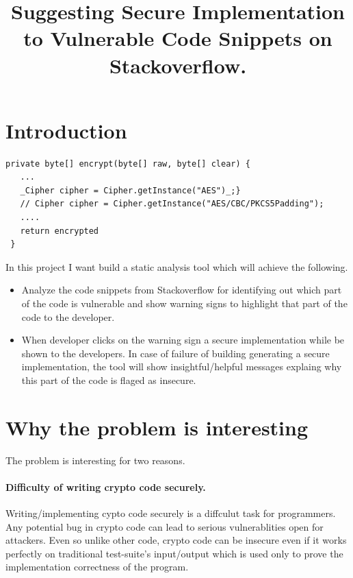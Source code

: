 \documentclass[sigconf]{acmart}
\begin{document}
\title{Suggesting Secure Implementation to Vulnerable Code Snippets on Stackoverflow.}


\maketitle
\section{Introduction}
\begin{lstlisting}[caption={A real code snippet taken from Stackoverflow. I want to build a tool which after analyzing the code snippet will highlight the part of the code that is insecure and suggest an alternative secure implementation as showed in the figure.}, label={fig:motivating-example}]
 private byte[] encrypt(byte[] raw, byte[] clear) {
   ...
   _Cipher cipher = Cipher.getInstance("AES")_;}
   // Cipher cipher = Cipher.getInstance("AES/CBC/PKCS5Padding");
   ....
   return encrypted
 }
  \end{lstlisting}
\label{into}
In this project I want build a static analysis tool which will achieve the following. 
\begin{itemize}
\item  Analyze the code snippets from Stackoverflow for identifying out which part of the code is vulnerable and show warning signs to highlight that part of the code to the developer.
\item When developer clicks on the warning sign a secure implementation while be shown to the developers. In case of failure of building generating a secure implementation, the tool will show insightful/helpful messages explaing why this part of the code is flaged as insecure.  
\end{itemize}

\section{Why the problem is interesting}
The problem is interesting for two reasons. 

\paragraph{Difficulty of writing crypto code securely.} Writing/implementing cypto code securely is a diffculut task for programmers. Any potential bug in crypto code can lead to serious vulnerablities open for attackers.
Even so unlike other code, crypto code can be insecure even if it works 
perfectly on traditional test-suite's input/output which is used only to prove the implementation correctness of the program.
\end{document}
